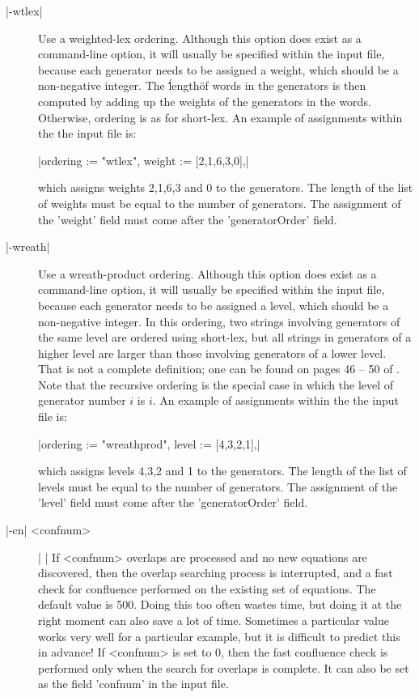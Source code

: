 \begin{description}
\item[|-wtlex|]
Use a weighted-lex ordering.
Although this option does exist as a command-line option, it will usually
be specified within the input file, because each generator needs to be
assigned a weight, which should be a non-negative integer. The \'\'length\"
of words in the generators is then computed by adding up the weights of the
generators in the words. Otherwise, ordering is as for short-lex.
An example of assignments within the the input file is:

|ordering := "wtlex", weight := [2,1,6,3,0],|

which assigns weights 2,1,6,3 and 0 to the generators. The length of the
list of weights must be equal to the number of generators. The assignment
of the 'weight' field must come after the 'generatorOrder' field.
\item[|-wreath|]
Use a wreath-product ordering.
Although this option does exist as a command-line option, it will usually
be specified within the input file, because each generator needs to be
assigned a level, which should be a non-negative integer.
In this ordering, two strings involving generators of the same level are
ordered using short-lex, but all strings in generators of a higher level are
larger than those involving generators of a lower level. That is not a
complete definition; one can be found  on pages 46 -- 50 of \cite{Sims94}.
Note that the recursive ordering is the special case in which the level
of generator number $i$ is $i$.
An example of assignments within the the input file is:

|ordering := "wreathprod", level := [4,3,2,1],|

which assigns levels 4,3,2 and 1 to the generators. The length of the
list of levels must be equal to the number of generators. The assignment
of the 'level' field must come after the 'generatorOrder' field.
\item[|-cn| <confnum>] | |\newline
If <confnum> overlaps are processed and no new equations are discovered, then
the overlap searching process is interrupted, and a fast check for
confluence performed on the existing set of equations.
The default value is 500. Doing this too often wastes time, but doing it
at the right moment can also save a lot of time. Sometimes a particular
value works very well for a particular example, but it is difficult
to predict this in advance! If <confnum> is set to 0, then the fast
confluence check is performed only when the search for overlaps is
complete.
It can also be set as the field 'confnum' in the input file.
\end{description}


